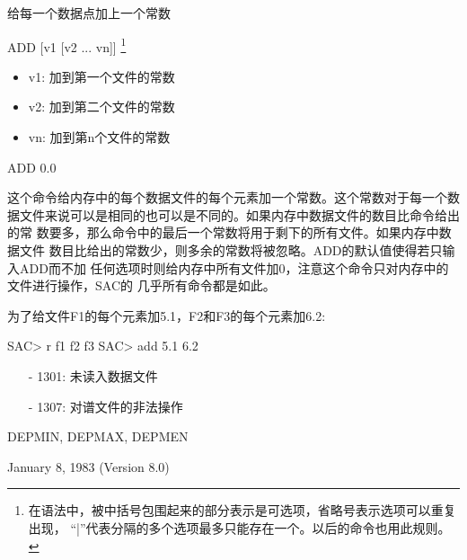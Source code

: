 \label{cmd:add}

给每一个数据点加上一个常数

ADD [v1 [v2 ... vn]]
\footnote{
在语法中，被中括号包围起来的部分表示是可选项，省略号表示选项可以重复出现，
``|''代表分隔的多个选项最多只能存在一个。以后的命令也用此规则。
}

\begin{itemize}
\item v1:  加到第一个文件的常数
\item v2:  加到第二个文件的常数
\item vn:  加到第n个文件的常数
\end{itemize}

ADD 0.0

这个命令给内存中的每个数据文件的每个元素加一个常数。这个常数对于每一个数
据文件来说可以是相同的也可以是不同的。如果内存中数据文件的数目比命令给出的常
数要多，那么命令中的最后一个常数将用于剩下的所有文件。如果内存中数据文件
数目比给出的常数少，则多余的常数将被忽略。ADD的默认值使得若只输入ADD而不加
任何选项时则给内存中所有文件加0，注意这个命令只对内存中的文件进行操作，SAC的
几乎所有命令都是如此。


为了给文件F1的每个元素加5.1，F2和F3的每个元素加6.2:
\begin{SACCode}
SAC> r f1 f2 f3
SAC> add 5.1 6.2
\end{SACCode}

\begin{itemize}
\item[-]1301: 未读入数据文件
\item[-]1307: 对谱文件的非法操作
\end{itemize}

DEPMIN, DEPMAX, DEPMEN

January 8, 1983 (Version 8.0)
